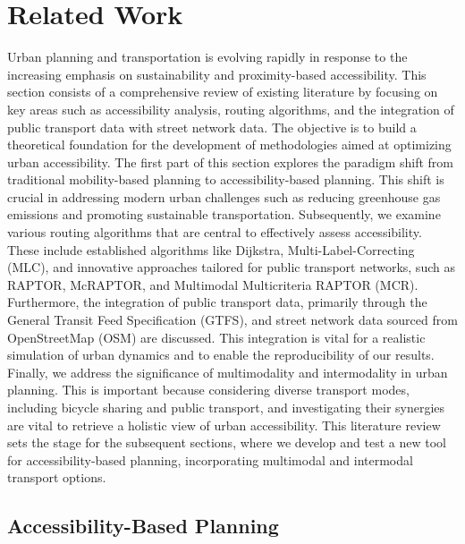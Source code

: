 \clearpage
\section{Related Work}
\label{sec:related_work}

Urban planning and transportation is evolving rapidly in response to the increasing emphasis on sustainability and proximity-based accessibility. 
This section consists of a comprehensive review of existing literature by focusing on key areas such as accessibility analysis, routing algorithms, and the integration of public transport data with street network data. 
The objective is to build a theoretical foundation for the development of methodologies aimed at optimizing urban accessibility. 
The first part of this section explores the paradigm shift from traditional mobility-based planning to accessibility-based planning.
This shift is crucial in addressing modern urban challenges such as reducing greenhouse gas emissions and promoting sustainable transportation. 
Subsequently, we examine various routing algorithms that are central to effectively assess accessibility. 
These include established algorithms like Dijkstra, Multi-Label-Correcting (MLC), and innovative approaches tailored for public transport networks, such as RAPTOR, McRAPTOR, and Multimodal Multicriteria RAPTOR (MCR). 
Furthermore, the integration of public transport data, primarily through the General Transit Feed Specification (GTFS), and street network data sourced from OpenStreetMap (OSM) are discussed. 
This integration is vital for a realistic simulation of urban dynamics and to enable the reproducibility of our results. 
Finally, we address the significance of multimodality and intermodality in urban planning.
This is important because considering diverse transport modes, including bicycle sharing and public transport, and investigating their synergies are vital to retrieve a holistic view of urban accessibility.
This literature review sets the stage for the subsequent sections, where we develop and test a new tool for accessibility-based planning, incorporating multimodal and intermodal transport options.


\subsection{Accessibility-Based Planning}
\label{subsec:accessibility_based_planning}

